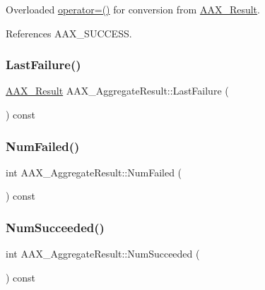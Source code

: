 Overloaded {\ttfamily \mbox{\hyperlink{a01605_a352314f927d81c236d8022b277853155}{operator=()}}} for conversion from \mbox{\hyperlink{a00392_a4d8f69a697df7f70c3a8e9b8ee130d2f}{A\+A\+X\+\_\+\+Result}}. 



References A\+A\+X\+\_\+\+S\+U\+C\+C\+E\+SS.

\mbox{\label{a01605_a0013779e238ac59fd554aa2315658a33}} 
\subsubsection{\texorpdfstring{LastFailure()}{LastFailure()}}
{\footnotesize\ttfamily \mbox{\hyperlink{a00392_a4d8f69a697df7f70c3a8e9b8ee130d2f}{A\+A\+X\+\_\+\+Result}} A\+A\+X\+\_\+\+Aggregate\+Result\+::\+Last\+Failure (\begin{DoxyParamCaption}{ }\end{DoxyParamCaption}) const\hspace{0.3cm}{\ttfamily [inline]}}

\mbox{\label{a01605_af566e9d83e13f3df53873e112b90a6d1}} 
\subsubsection{\texorpdfstring{NumFailed()}{NumFailed()}}
{\footnotesize\ttfamily int A\+A\+X\+\_\+\+Aggregate\+Result\+::\+Num\+Failed (\begin{DoxyParamCaption}{ }\end{DoxyParamCaption}) const\hspace{0.3cm}{\ttfamily [inline]}}

\mbox{\label{a01605_a4b3ef5ae845c708b2f5d4e94f22fbfee}} 
\subsubsection{\texorpdfstring{NumSucceeded()}{NumSucceeded()}}
{\footnotesize\ttfamily int A\+A\+X\+\_\+\+Aggregate\+Result\+::\+Num\+Succeeded (\begin{DoxyParamCaption}{ }\end{DoxyParamCaption}) const\hspace{0.3cm}{\ttfamily [inline]}}

